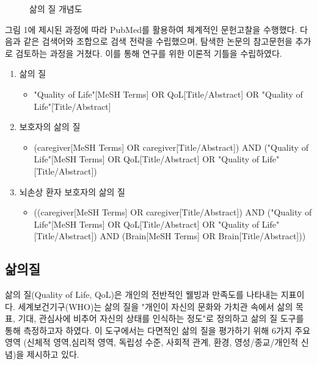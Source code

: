 \documentclass{article}
\begin{document}
\begin{figure}[H]
    \centering
    \caption{삶의 질 개념도}
    \label{fig:qol_diagram}
\end{figure}

그림 1에 제시된 과정에 따라 PubMed를 활용하여 체계적인 문헌고찰을 수행했다. 다음과 같은 검색어와 조합으로 검색 전략을 수립했으며, 탐색한 논문의 참고문헌을 추가로 검토하는 과정을 거쳤다. 이를 통해 연구를 위한 이론적 기틀을 수립하였다.

\begin{enumerate}
    \item 삶의 질
    \begin{itemize}
        \item "Quality of Life"[MeSH Terms] OR QoL[Title/Abstract] OR "Quality of Life"[Title/Abstract]
    \end{itemize}
    
    \item 보호자의 삶의 질
    \begin{itemize}
        \item (caregiver[MeSH Terms] OR caregiver[Title/Abstract]) AND ("Quality of Life"[MeSH Terms] OR QoL[Title/Abstract] OR "Quality of Life"[Title/Abstract])
    \end{itemize}
    
    \item 뇌손상 환자 보호자의 삶의 질
    \begin{itemize}
        \item ((caregiver[MeSH Terms] OR caregiver[Title/Abstract]) AND ("Quality of Life"[MeSH Terms] OR QoL[Title/Abstract] OR "Quality of Life"[Title/Abstract]) AND (Brain[MeSH Terms] OR Brain[Title/Abstract]))
    \end{itemize}
\end{enumerate}

\subsection{삶의질}
삶의 질(Quality of Life, QoL)은 개인의 전반적인 웰빙과 만족도를 나타내는 지표이다.
세계보건기구(WHO)는 삶의 질을 "개인이 자신의 문화와 가치관 속에서 삶의 목표, 기대, 관심사에 비추어 자신의 상태를 인식하는 정도"로 정의하고 삶의 질 도구를 통해 측정하고자 하였다\cite{whoqol1995world}.
이 도구에서는 다면적인 삶의 질을 평가하기 위해 6가지 주요 영역 (신체적 영역,심리적 영역, 독립성 수준, 사회적 관계, 환경, 영성/종교/개인적 신념)을 제시하고 있다.
\end{document}
